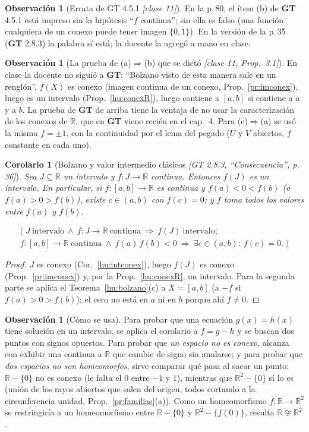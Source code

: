 \documentclass[11pt,a4paper]{article}
\newcommand{\lgc}[1]{\par\vspace{-3pt}\begin{gather*}\big(\;#1\;\big)\end{gather*}\vspace{-6pt}}
\theoremstyle{definition}
\newtheorem{observacion}[definicion]{Observación}
\theoremstyle{plain}
\newtheorem{corolario}[definicion]{Corolario}
\newcommand{\fnt}[1]{{\normalfont\small\itshape\color{gray!150!black}[#1]}}
\newcommand{\R}{\mathbb{R}}
\begin{document}
\begin{observacion}[Errata de GT 4.5.1 \fnt{clase 11}]
En la p.\,80, el ítem (b) de \textbf{GT} 4.5.1 está impreso sin la hipótesis ``$f$ continua''; sin ella es falso (una función cualquiera de un conexo puede tener imagen $\{0,1\}$). En la versión de la p.\,35 (\textbf{GT} 2.8.3) la palabra sí está; la docente la agregó a mano en clase.
\end{observacion}

\begin{observacion}[La prueba de (a)$\Rightarrow$(b) que se dictó \fnt{clase 11, Prop.\ 3.1}]
En clase la docente no siguió a \textbf{GT}: ``Bolzano visto de esta manera sale en un renglón''. $f(X)$ es conexo (imagen continua de un conexo, Prop.~\ref{pr:imconex}), luego es un intervalo (Prop.~\ref{hu:conexR}), luego contiene a $[a,b]$ si contiene a $a$ y a $b$. La prueba de \textbf{GT} de arriba tiene la ventaja de no usar la caracterización de los conexos de $\R$, que en \textbf{GT} viene recién en el cap.~4. Para (c)$\Rightarrow$(a) se usó la misma $f=\pm1$, con la continuidad por el lema del pegado ($U$ y $V$ abiertos, $f$ constante en cada uno).
\end{observacion}

\begin{corolario}[Bolzano y valor intermedio clásicos \fnt{GT 2.8.3, ``Consecuencia'', p.\,36}]\label{hu:tvi}
Sea $J\subseteq\R$ un intervalo y $f:J\to\R$ continua. Entonces $f(J)$ es un intervalo. En particular, si $f:[a,b]\to\R$ es continua y $f(a)<0<f(b)$ (o $f(a)>0>f(b)$), existe $c\in(a,b)$ con $f(c)=0$; y $f$ toma todos los valores entre $f(a)$ y $f(b)$.
\lgc{J\ \text{intervalo}\ \wedge\ f:J\to\R\ \text{continua}\ \Rightarrow\ f(J)\ \text{intervalo};\\
f:[a,b]\to\R\ \text{continua}\ \wedge\ f(a)\,f(b)<0\ \Rightarrow\ \exists c\in(a,b):\ f(c)=0.}
\end{corolario}

\begin{proof}
$J$ es conexo (Cor.~\ref{hu:intconex}), luego $f(J)$ es conexo (Prop.~\ref{pr:imconex}) y, por la Prop.~\ref{hu:conexR}, un intervalo. Para la segunda parte se aplica el Teorema~\ref{hu:bolzano}(c) a $X=[a,b]$ (a $-f$ si $f(a)>0>f(b)$); el cero no está en $a$ ni en $b$ porque ahí $f\ne0$.
\end{proof}

\begin{observacion}[Cómo se usa]
Para probar que una ecuación $g(x)=h(x)$ tiene solución en un intervalo, se aplica el corolario a $f=g-h$ y se buscan dos puntos con signos opuestos. Para probar que \emph{un espacio no es conexo}, alcanza con exhibir una continua a $\R$ que cambie de signo sin anularse; y para probar que \emph{dos espacios no son homeomorfos}, sirve comparar qué pasa al sacar un punto: $\R-\{0\}$ no es conexo (le falta el $0$ entre $-1$ y $1$), mientras que $\R^2-\{0\}$ sí lo es (unión de los rayos abiertos que salen del origen, todos cortando a la circunferencia unidad, Prop.~\ref{pr:familias}(a)). Como un homeomorfismo $f:\R\to\R^2$ se restringiría a un homeomorfismo entre $\R-\{0\}$ y $\R^2-\{f(0)\}$, resulta $\R\not\cong\R^2$.
\end{observacion}
\end{document}
